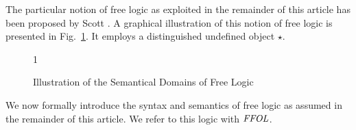The particular notion of free logic as exploited in the remainder of
this article has been proposed by Scott \cite{Scott67}.  A graphical
illustration of this notion of free logic is presented in
Fig.~\ref{fig1}. It
employs a distinguished undefined object $\star$.  
\begin{figure}
\centering
\newcommand\firstellipse{(2,-5) ellipse (6cm and 4cm)}
\newcommand\secondellipse{(0,-5.3) ellipse (3.5cm and 2.5cm)}1
\caption{Illustration of the Semantical Domains of Free Logic \label{fig1}}
\end{figure}

We now formally introduce the syntax and semantics of free logic as
assumed in the remainder of this article. We refer to this logic with $\mathit{FFOL}$.

